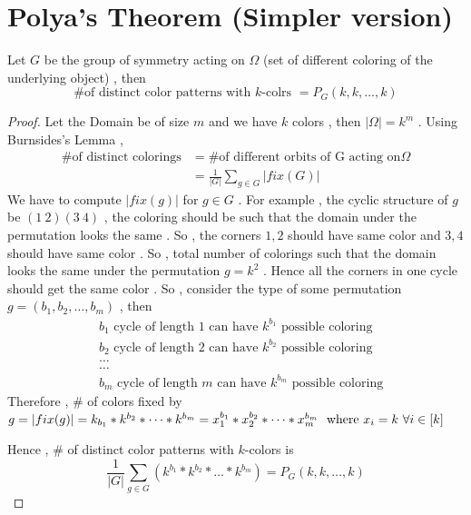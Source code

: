 \section{Polya's Theorem (Simpler version)}
\begin{theorem}Let $G$ be the group of symmetry acting on $\Omega$ (set of different coloring of the underlying object) , then 
$$\textrm{\# of distinct color patterns with $k$-colrs } = P_G(k,k,\dots,k)$$
\begin{proof}
Let the Domain be of size $m$ and we have $k$ colors , then  $|\Omega|=k^m$ . Using Burnsides's Lemma ,  
\begin{align*}
    \textrm{\# of distinct colorings} &= \textrm{\# of different orbits of G acting on} \Omega\\
    &= \frac{1}{|G|}\sum_{g\in G} |fix(G)|
\end{align*}
We have to compute $|fix(g)|$ for $g\in G$ . For example , the cyclic structure of $g$ be $(1~2)(3~4)$ , the coloring should be such that the domain under the permutation looks the same . So , the corners $1,2$ should have same color and $3,4$ should have same color . So , total number of colorings such that the domain looks the same under the permutation $g = k^2$ . Hence all the corners in one cycle should get the same color . So , consider the type of some permutation $g=(b_1,b_2,\dots,b_m)$ , then
\begin{align*}
    &\textrm{$b_1$ cycle of length $1$ can have $k^{b_1}$ possible coloring}\\
    &\textrm{$b_2$ cycle of length $2$ can have $k^{b_2}$ possible coloring}\\
    &\dots\\
    &\dots\\
    &\textrm{$b_m$ cycle of length $m$ can have $k^{b_m}$ possible coloring}
\end{align*}
Therefore , \# of colors fixed by $g=|fix(g)|=k_{b_1}*k^{b_2}*\dots*k^{b_m} = x_1^{b_1}*x_2^{b_2}*\dots*x_m^{b_m} ~~~\\\textrm{where } x_i=k~\forall i\in [k]$

Hence , \# of distinct color patterns with $k$-colors is 
$$\frac{1}{|G|}\sum_{g\in G}\left(k^{b_1}*k^{b_2}*\dots*k^{b_m}\right)= P_G(k,k,\dots,k)$$
\end{proof}
\end{theorem}
